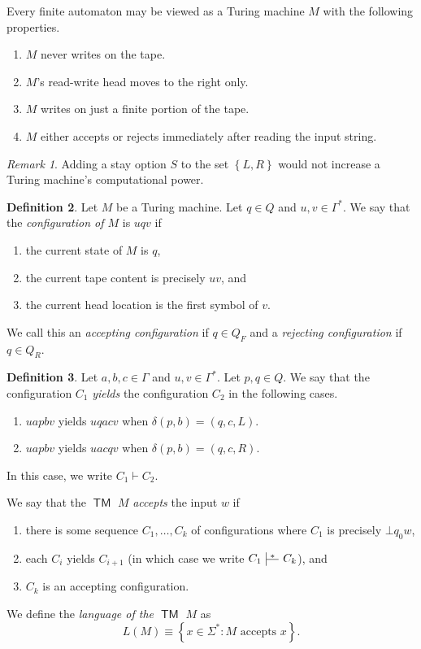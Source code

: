 \documentclass[10pt,letterpaper,cm]{nupset}
\theoremstyle{definition}
\newtheorem{definition}{Definition}[subsection]
\theoremstyle{theorem}
\theoremstyle{remark}
\newtheorem{remark}[definition]{Remark}
\def\ruleoffset{1pt}
\newcommand\specialvdash[2]{\mathrel{\ensurestackMath{
  \mkern2mu\rule[-\dp\strutbox]{.4pt}{\baselineskip}\stackon[\ruleoffset]{
    \stackunder[\dimexpr\ruleoffset-.4\ht\strutbox+.4\dp\strutbox]{
      \rule[\dimexpr.4\ht\strutbox-.4\dp\strutbox]{2.5ex}{.4pt}}{
        \scriptstyle #1}}{\scriptstyle#2}\mkern2mu}}
}
\newcommand{\1}{\mathbf{1}}
\newcommand{\0}{\vec 0}
\DeclareMathOperator{\TM}{\mathsf{TM}}
\begin{document}
Every finite automaton may be viewed as a Turing machine $M$ with the following properties. 
\begin{enumerate}[label=(\alph*)]
\item $M$ never writes on the tape.
\item $M$'s read-write head moves to the right only.
\item $M$ writes on just a finite portion of the tape.
\item $M$ either accepts or rejects immediately after reading the input string. 
\end{enumerate}


\begin{remark}
Adding a stay option $S$ to the set $\left\{L, R\right\}$ would not increase a Turing machine's computational power.
\end{remark}

\begin{definition}
Let $M$ be a Turing machine. Let $q\in Q$ and $u,v\in \Gamma^{\ast}$. We say that the \textit{configuration of $M$} is $uqv$ if 
\begin{enumerate}[label=(\alph*)]
\item the current state of $M$ is $q$,
\item the current tape content is precisely $uv$, and
\item the current head location is the first symbol of $v$.
\end{enumerate}
We call this an \textit{accepting configuration} if $q \in Q_F$ and a \textit{rejecting configuration} if $q \in Q_R$.
\end{definition}

\begin{definition}
Let $a,b,c\in \Gamma$ and $u,v\in \Gamma^{\ast}$. Let $p,q\in Q$. We say that the configuration $C_1$ \textit{yields} the configuration $C_2$ in the following cases.
\begin{enumerate}[label=(\alph*)]
\item $uapbv$ yields $uqacv$ when $\delta(p,b) = \left(q, c, L\right)$.
\item $uapbv$ yields $uacqv$ when $\delta(p, b) = \left(q, c, R\right)$. 
\end{enumerate}
In this case, we write $C_1 \vdash C_2$.
\end{definition}

\medskip

We say that the $\TM$ $M$ \textit{accepts} the input $w$ if 
\begin{enumerate}[label=(\roman*)]
\item there is some sequence $C_1, \ldots, C_k$ of configurations where $C_1$ is precisely  $\bot q_0w$, 
\item each $C_i$ yields $C_{i+1}$ (in which case we write $C_1 \specialvdash{}{*} C_k$), and
\item $C_k$ is an accepting configuration. 
\end{enumerate}
We define the \textit{language of the $\TM$ $M$} as $$L(M) \equiv \left\{x \in \Sigma^{\ast}: M \text{ accepts } x \right\}.$$
\end{document}
